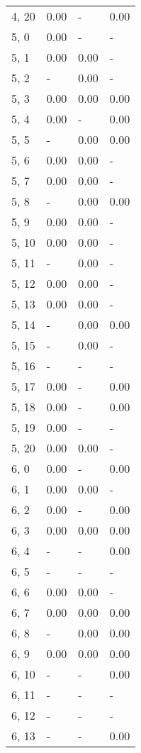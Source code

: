 \begin{table}
\begin{tabular}{llll}
4, 20  &  0.00 &     - &  0.00 \\
5, 0   &  0.00 &     - &     - \\
5, 1   &  0.00 &  0.00 &     - \\
5, 2   &     - &  0.00 &     - \\
5, 3   &  0.00 &  0.00 &  0.00 \\
5, 4   &  0.00 &     - &  0.00 \\
5, 5   &     - &  0.00 &  0.00 \\
5, 6   &  0.00 &  0.00 &     - \\
5, 7   &  0.00 &  0.00 &     - \\
5, 8   &     - &  0.00 &  0.00 \\
5, 9   &  0.00 &  0.00 &     - \\
5, 10  &  0.00 &  0.00 &     - \\
5, 11  &     - &  0.00 &     - \\
5, 12  &  0.00 &  0.00 &     - \\
5, 13  &  0.00 &  0.00 &     - \\
5, 14  &     - &  0.00 &  0.00 \\
5, 15  &     - &  0.00 &     - \\
5, 16  &     - &     - &     - \\
5, 17  &  0.00 &     - &  0.00 \\
5, 18  &  0.00 &     - &  0.00 \\
5, 19  &  0.00 &     - &     - \\
5, 20  &  0.00 &  0.00 &     - \\
6, 0   &  0.00 &     - &  0.00 \\
6, 1   &  0.00 &  0.00 &     - \\
6, 2   &  0.00 &     - &  0.00 \\
6, 3   &  0.00 &  0.00 &  0.00 \\
6, 4   &     - &     - &  0.00 \\
6, 5   &     - &     - &     - \\
6, 6   &  0.00 &  0.00 &     - \\
6, 7   &  0.00 &  0.00 &  0.00 \\
6, 8   &     - &  0.00 &  0.00 \\
6, 9   &  0.00 &  0.00 &  0.00 \\
6, 10  &     - &     - &  0.00 \\
6, 11  &     - &     - &     - \\
6, 12  &     - &     - &     - \\
6, 13  &     - &     - &  0.00 \\

\end{tabular}
\end{table}
